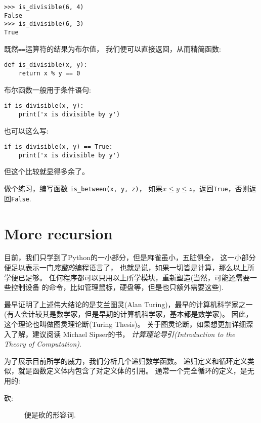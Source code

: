 \documentclass[10pt]{book}
\begin{document}
\begin{verbatim}
>>> is_divisible(6, 4)
False
>>> is_divisible(6, 3)
True
\end{verbatim}
%
 既然{\tt ==}运算符的结果为布尔值，
我们便可以直接返回，从而精简函数:

\begin{verbatim}
def is_divisible(x, y):
    return x % y == 0
\end{verbatim}
%
布尔函数一般用于条件语句:

\begin{verbatim}
if is_divisible(x, y):
    print('x is divisible by y')
\end{verbatim}
%
也可以这么写:

\begin{verbatim}
if is_divisible(x, y) == True:
    print('x is divisible by y')
\end{verbatim}
%
但这个比较就显得多余了。

做个练习，编写函数 \verb"is_between(x, y, z)"，
如果$x \le y \le z$，返回{\tt True}，否则返回{\tt False}.


\section{More recursion}
\label{more.recursion}

目前，我们只学到了Python的一小部分，但是麻雀虽小，五脏俱全，
这一小部分便足以表示一门{\em 完整的}编程语言了，
也就是说，如果一切皆是计算，那么以上所学便已足够。
任何程序都可以只用以上所学模块，重新塑造(当然，可能还需要一些控制设备
的命令，比如管理鼠标，硬盘等，但是也只额外需要这些).

最早证明了上述伟大结论的是艾兰图灵(Alan Turing)，最早的计算机科学家之一
(有人会计较其是数学家，但是早期的计算机科学家，基本都是数学家)。
因此，这个理论也叫做图灵理论断(Turing Thesis)。
关于图灵论断，如果想更加详细深入了解，建议阅读 Michael Sipser的书，
 {\em 计算理论导引(Introduction to the Theory of Computation)}.

为了展示目前所学的威力，我们分析几个递归数学函数。
递归定义和循环定义类似，就是函数定义体内包含了对定义体的引用。
通常一个完全循环的定义，是无用的:

\begin{description}

\item[砍:] 便是砍的形容词.

\end{description}
\end{document}
